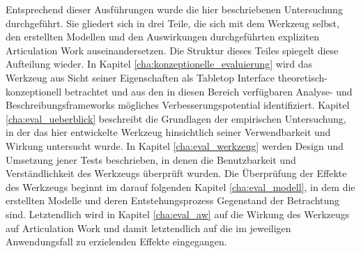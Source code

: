Entsprechend dieser Ausführungen wurde die hier beschriebenen Untersuchung durchgeführt. Sie gliedert sich in drei Teile, die sich mit dem Werkzeug selbst, den erstellten Modellen und den Auswirkungen durchgeführten expliziten Articulation Work auseinandersetzen. Die Struktur dieses Teiles spiegelt diese Aufteilung wieder. In Kapitel \ref{cha:konzeptionelle_evaluierung} wird das Werkzeug aus Sicht seiner Eigenschaften als Tabletop Interface theoretisch-konzeptionell betrachtet und aus den in diesen Bereich verfügbaren Analyse- und Beschreibungsframeworks mögliches Verbesserungspotential identifiziert. Kapitel \ref{cha:eval_ueberblick} beschreibt die Grundlagen der empirischen Untersuchung, in der das hier entwickelte Werkzeug hinsichtlich seiner Verwendbarkeit und Wirkung untersucht wurde. In Kapitel \ref{cha:eval_werkzeug} werden Design und Umsetzung jener Tests beschrieben, in denen die Benutzbarkeit und Verständlichkeit des Werkzeugs überprüft wurden. Die Überprüfung der Effekte des Werkzeugs beginnt im darauf folgenden Kapitel \ref{cha:eval_modell}, in dem die erstellten Modelle und deren Entstehungsprozess Gegenstand der Betrachtung sind. Letztendlich wird in Kapitel \ref{cha:eval_aw} auf die Wirkung des Werkzeugs auf Articulation Work und damit letztendlich auf die im jeweiligen Anwendungsfall zu erzielenden Effekte eingegangen.










%
%

